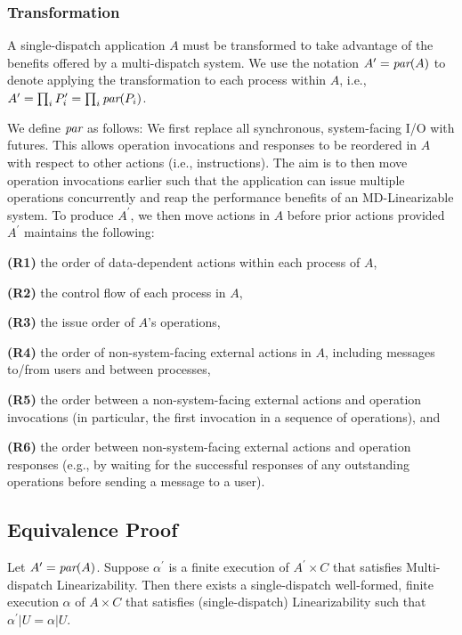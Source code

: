 \subsubsection{Transformation}
\label{sec:equivalence:preliminaries:transform}

A single-dispatch application $A$ must be transformed to take advantage of the benefits offered by a multi-dispatch system. We use the notation $A^\prime = \operatorname*{\textit{par}}(A)$ to denote applying the transformation to each process within $A$, i.e., $A^\prime = \prod_i P^\prime_i = \prod_i \operatorname*{\textit{par}}(P_i)$.

We define $\operatorname*{\textit{par}}$ as follows: We first replace all synchronous, system-facing I/O with futures. This allows operation invocations and responses to be reordered in $A$ with respect to other actions (i.e., instructions). The aim is to then move operation invocations earlier such that the application can issue multiple operations concurrently and reap the performance benefits of an MD-Linearizable system.
To produce $A^\prime$, we then move actions in $A$ before prior actions provided $A^\prime$ maintains the following:

    \textbf{(R1)} the order of data-dependent actions within each process of $A$,
    
    \textbf{(R2)} the control flow of each process in $A$,
    
    \textbf{(R3)} the issue order of $A$’s operations,
    
    \textbf{(R4)} the order of non-system-facing external actions in $A$, including messages to/from users and between processes,
    
    \textbf{(R5)} the order between a non-system-facing external actions and operation invocations (in particular, the first invocation in a sequence of operations), and
    
    \textbf{(R6)} the order between non-system-facing external actions and operation responses (e.g., by waiting for the successful responses of any outstanding operations before sending a message to a user).

\subsection{Equivalence Proof}
\label{sec:equivalence:proof}

\begin{thm}
 Let $A^\prime = \operatorname*{\textit{par}}(A)$. Suppose $\alpha^\prime$ is a finite execution of $A^\prime \times C$ that satisfies Multi-dispatch Linearizability. Then there exists a single-dispatch well-formed, finite execution $\alpha$ of $A \times C$ that satisfies (single-dispatch) Linearizability such that $\alpha^\prime | U = \alpha | U$.
\end{thm}

